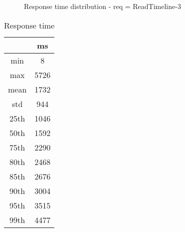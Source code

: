 \begin{minipage}{0.75\linewidth}
\begin{figure}[h]
\begin{adjustbox}{max width=1.0\linewidth, keepaspectratio}
  \end{adjustbox}
  \caption{Response time distribution - req = ReadTimeline-3}
\end{figure}
\end{minipage}\hfill\begin{minipage}{0.18\linewidth}
\begin{table}[h]
\begin{tabular}{|cc|}
\hline
\textbf{} & \textbf{ms}\\ \hline
 \Xhline{0.005\arrayrulewidth}
min & 8\\
 \Xhline{0.005\arrayrulewidth}
max & 5726\\
 \Xhline{0.005\arrayrulewidth}
mean & 1732\\
 \Xhline{0.005\arrayrulewidth}
std & 944\\
\hline
\hline
 \Xhline{0.005\arrayrulewidth}
25th & 1046\\
 \Xhline{0.005\arrayrulewidth}
50th & 1592\\
 \Xhline{0.005\arrayrulewidth}
75th & 2290\\
 \Xhline{0.005\arrayrulewidth}
80th & 2468\\
 \Xhline{0.005\arrayrulewidth}
85th & 2676\\
 \Xhline{0.005\arrayrulewidth}
90th & 3004\\
 \Xhline{0.005\arrayrulewidth}
95th & 3515\\
 \Xhline{0.005\arrayrulewidth}
99th & 4477\\
\hline
\end{tabular}
\caption{Response time}
\end{table}
\end{minipage}\hfill